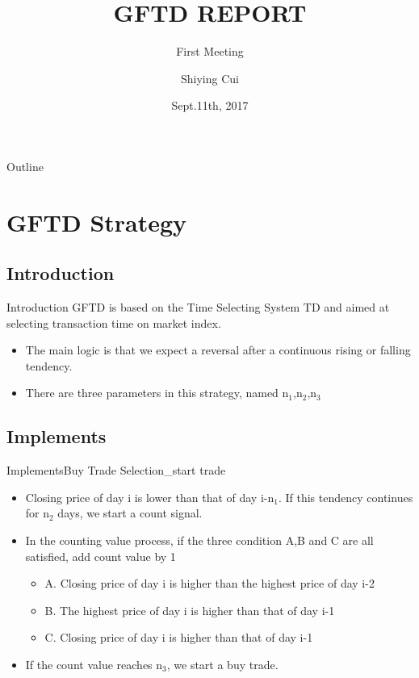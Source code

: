 \documentclass{beamer}
\title{GFTD REPORT}
\subtitle{First Meeting}
\author{Shiying Cui}
\institute{Hyde Renaissance Capital Management Limited}
\date{Sept.11th, 2017}
\begin{document}
\begin{frame}
  \titlepage
\end{frame}

\begin{frame}{Outline}
  \tableofcontents
\end{frame}

\section{GFTD Strategy}

\subsection{Introduction}

\begin{frame}{Introduction}
GFTD is based on the Time Selecting System TD and aimed at selecting transaction time on market index.
  \begin{itemize}
  \item {
    The main logic is that we expect a reversal after a continuous rising or falling tendency.
    \pause
  }
  \item {
    There are three parameters in this strategy, named n$_1$,n$_2$,n$_3$ 
    \pause
  }
  \end{itemize}
\end{frame}

\subsection{Implements}

\begin{frame}{Implements}{Buy Trade Selection_start trade}
  \begin{itemize}
  \item {
    Closing price of day i is lower than that of day i-n$_1$.
	If this tendency continues for n$_2$ days, we start a count signal.
	\pause
  }
  \item {
    In the counting value process, if the three condition A,B and C are all satisfied, add count value by 1
  \begin{itemize}
  \item<3->{
    A. Closing price of day i is higher than the highest price of day i-2
  }
  \item<4->{
    B. The highest price of day i is higher than that of day i-1
  }
  \item<5->{
    C. Closing price of day i is higher than that of day i-1
  }
  \end{itemize}
  }
  \item<6->{
    If the count value reaches n$_3$, we start a buy trade.
  }
  \end{itemize}
\end{frame}
\end{document}
